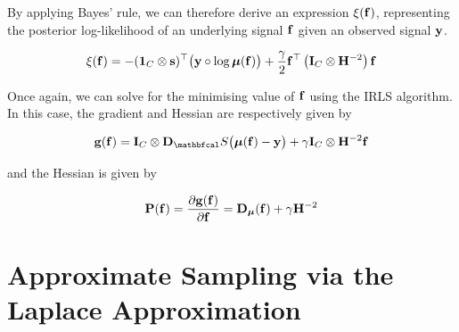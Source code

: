 By applying Bayes' rule, we can therefore derive an expression $\xi(\mathbf{f})$, representing the posterior log-likelihood of an underlying signal $\mathbf{f}$ given an observed signal $\mathbf{y}$. 

\begin{equation*}
    \xi(\mathbf{f}) = - (\mathbf{1}_C \otimes \mathbf{s})^\top \big(\mathbf{y} \circ \log \boldsymbol{\mu}(\mathbf{f}) \big) + \frac{\gamma}{2} \mathbf{f}^\top \left(\mathbf{I}_C \otimes \mathbf{H}^{-2}\right) \mathbf{f}
\end{equation*}

Once again, we can solve for the minimising value of $\mathbf{f}$ using the IRLS algorithm. In this case, the gradient and Hessian are respectively given by 

\begin{equation}
    \g(\f) = \I_C \otimes \D_\St \big(\muu(\f) - \y\big) + \gamma \I_C \otimes \HH^{-2} \f
\end{equation}

and the Hessian is given by 

\begin{equation}
    \mathbf{P}(\mathbf{f}) = \frac{\partial \mathbf{g}(\mathbf{f})}{\partial \mathbf{f}} =  \mathbf{D}_{\boldsymbol{\mu}}(\mathbf{f}) + \gamma \mathbf{H}^{-2}
\end{equation}



\section{Approximate Sampling via the Laplace Approximation}

\label{sec:lsamp}

